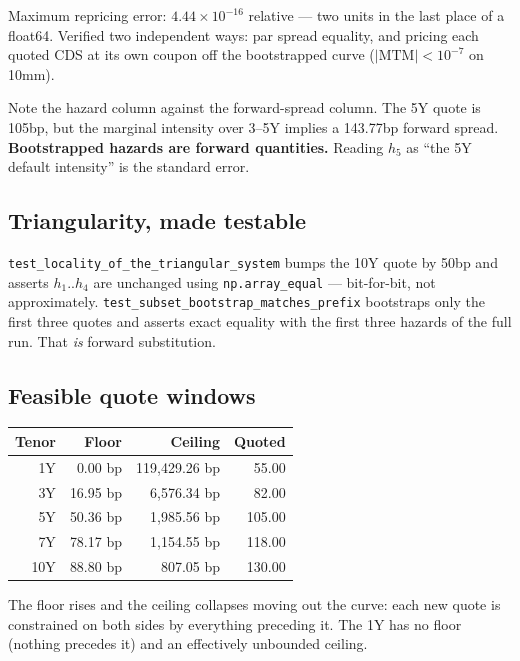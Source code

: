 \documentclass[11pt,a4paper]{article}
\newcommand{\keypoint}[1]{%
  \par\vspace{0.4em}\noindent
  \colorbox{codebg}{\parbox{\dimexpr\linewidth-2\fboxsep}{\small #1}}%
  \par\vspace{0.5em}}
\begin{document}
Maximum repricing error: $4.44\times10^{-16}$ relative --- two units in the last place of a
float64. Verified two independent ways: par spread equality, and pricing each quoted CDS at
its own coupon off the bootstrapped curve ($|\text{MTM}| < 10^{-7}$ on 10mm).

\keypoint{Note the hazard column against the forward-spread column. The 5Y quote is 105bp,
but the marginal intensity over 3--5Y implies a 143.77bp forward spread. \textbf{Bootstrapped
hazards are forward quantities.} Reading $h_5$ as ``the 5Y default intensity'' is the standard
error.}

\subsection{Triangularity, made testable}

\texttt{test\_locality\_of\_the\_triangular\_system} bumps the 10Y quote by 50bp and asserts
$h_1..h_4$ are unchanged using \texttt{np.array\_equal} --- bit-for-bit, not approximately.
\texttt{test\_subset\_bootstrap\_matches\_prefix} bootstraps only the first three quotes and
asserts exact equality with the first three hazards of the full run. That \emph{is} forward
substitution.

\subsection{Feasible quote windows}

\begin{center}
\begin{tabular}{rrrr}
\toprule
\textbf{Tenor} & \textbf{Floor} & \textbf{Ceiling} & \textbf{Quoted} \\
\midrule
1Y  & 0.00 bp   & 119,429.26 bp & 55.00 \\
3Y  & 16.95 bp  & 6,576.34 bp   & 82.00 \\
5Y  & 50.36 bp  & 1,985.56 bp   & 105.00 \\
7Y  & 78.17 bp  & 1,154.55 bp   & 118.00 \\
10Y & 88.80 bp  & 807.05 bp     & 130.00 \\
\bottomrule
\end{tabular}
\end{center}

The floor rises and the ceiling collapses moving out the curve: each new quote is constrained
on both sides by everything preceding it. The 1Y has no floor (nothing precedes it) and an
effectively unbounded ceiling.
\end{document}
